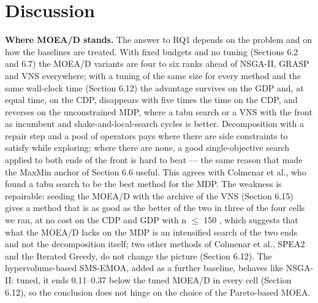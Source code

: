 \section{Discussion}\label{sec:discussion}

\textbf{Where MOEA/D stands.} The answer to RQ1 depends on the problem and on how the baselines are treated. With fixed budgets and no tuning (Sections 6.2 and 6.7) the MOEA/D variants are four to six ranks ahead of NSGA-II, GRASP and VNS everywhere; with a tuning of the same size for every method and the same wall-clock time (Section 6.12) the advantage survives on the GDP and, at equal time, on the CDP, disappears with five times the time on the CDP, and reverses on the unconstrained MDP, where a tabu search or a VNS with the front as incumbent and shake-and-local-search cycles is better. Decomposition with a repair step and a pool of operators pays where there are side constraints to satisfy while exploring; where there are none, a good single-objective search applied to both ends of the front is hard to beat --- the same reason that made the MaxMin anchor of Section 6.6 useful. This agrees with Colmenar et al., who found a tabu search to be the best method for the MDP. The weakness is repairable: seeding the MOEA/D with the archive of the VNS (Section 6.15) gives a method that is as good as the better of the two in three of the four cells we ran, at no cost on the CDP and GDP with n $\leq$ 150 , which suggests that what the MOEA/D lacks on the MDP is an intensified search of the two ends and not the decomposition itself; two other methods of Colmenar et al., SPEA2 and the Iterated Greedy, do not change the picture (Section 6.12). The hypervolume-based SMS-EMOA, added as a further baseline, behaves like NSGA-II: tuned, it ends 0.11--0.37 below the tuned MOEA/D in every cell (Section 6.12), so the conclusion does not hinge on the choice of the Pareto-based MOEA.

